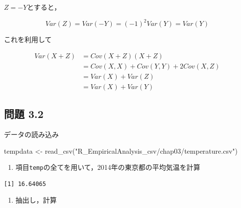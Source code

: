 \documentclass[
  letterpaper,
  DIV=11,
  numbers=noendperiod]{scrartcl}
\newenvironment{Shaded}{\begin{snugshade}}{\end{snugshade}}
\newcommand{\CommentTok}[1]{\textcolor[rgb]{0.37,0.37,0.37}{#1}}
\newcommand{\DecValTok}[1]{\textcolor[rgb]{0.68,0.00,0.00}{#1}}
\newcommand{\FunctionTok}[1]{\textcolor[rgb]{0.28,0.35,0.67}{#1}}
\newcommand{\NormalTok}[1]{\textcolor[rgb]{0.00,0.23,0.31}{#1}}
\newcommand{\OtherTok}[1]{\textcolor[rgb]{0.00,0.23,0.31}{#1}}
\newcommand{\SpecialCharTok}[1]{\textcolor[rgb]{0.37,0.37,0.37}{#1}}
\newcommand{\StringTok}[1]{\textcolor[rgb]{0.13,0.47,0.30}{#1}}
\providecommand{\tightlist}{%
  \setlength{\itemsep}{0pt}\setlength{\parskip}{0pt}}\usepackage{longtable,booktabs,array}
\begin{document}
\(Z = -Y\)とすると，

\[
Var(Z) = Var(-Y) = (-1)^2Var(Y) = Var(Y)
\]

これを利用して

\[\begin{split}
Var(X+Z) &= Cov(X+Z)(X+Z) \\
&=Cov(X,X)+Cov(Y,Y)+2Cov(X,Z) \\
&= Var(X) + Var(Z) \\
&= Var(X) + Var(Y)
\end{split}\]

\hypertarget{ux554fux984c-3.2}{%
\subsection{問題 3.2}\label{ux554fux984c-3.2}}

データの読み込み

\begin{Shaded}
\begin{Highlighting}[]
\NormalTok{tempdata }\OtherTok{\textless{}{-}} \FunctionTok{read\_csv}\NormalTok{(}\StringTok{"R\_EmpiricalAnalysis\_csv/chap03/temperature.csv"}\NormalTok{)}
\end{Highlighting}
\end{Shaded}

\begin{enumerate}
\def\labelenumi{\arabic{enumi}.}
\tightlist
\item
  項目\texttt{temp}の全てを用いて，2014年の東京都の平均気温を計算
\end{enumerate}

\begin{Shaded}
\end{Shaded}

\begin{verbatim}
[1] 16.64065
\end{verbatim}

\begin{enumerate}
\def\labelenumi{\arabic{enumi}.}
\setcounter{enumi}{1}
\tightlist
\item
  抽出し，計算
\end{enumerate}

\begin{Shaded}
\end{Shaded}
\end{document}
